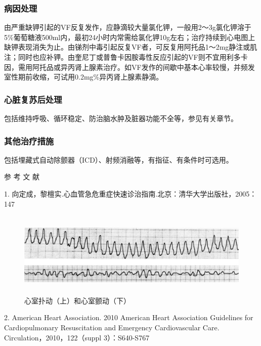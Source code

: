 \subsubsection{病因处理}

由严重缺钾引起的VF反复发作，应静滴较大量氯化钾，一般用2～3g氯化钾溶于5\%葡萄糖液500ml内，最初24小时内常需给氯化钾10g左右；治疗持续到心电图上缺钾表现消失为止。由锑剂中毒引起反复VF者，可反复用阿托品1～2mg静注或肌注；同时也应补钾。由奎尼丁或普鲁卡因胺毒性反应引起的VF则不宜用利多卡因，需用阿托品或异丙肾上腺素治疗。如VF发作的间歇中基本心率较慢，并频发室性期前收缩，可试用0.2mg\%异丙肾上腺素静滴。

\subsubsection{心脏复苏后处理}

包括维持呼吸、循环稳定、防治脑水肿及脏器功能不全等，参见有关章节。

\subsubsection{其他治疗措施}

包括埋藏式自动除颤器（ICD）、射频消融等，有指征、有条件时可选用。

\hypertarget{text00296.htmlux5cux23CHP10-2-9-4}{}
参 考 文 献

1.
向定成，黎檀实.心血管急危重症快速诊治指南.北京：清华大学出版社，2005：147

\begin{figure}[!htbp]
 \centering
 \includegraphics[width=6.29167in,height=1.59375in]{./images/Image00458.jpg}
 \captionsetup{justification=centering}
 \caption{心室扑动（上）和心室颤动（下）}
 \label{fig102-19}
  \end{figure} 

2. American Heart Association. 2010 American Heart Association
Guidelines for Cardiopulmonary Resuscitation and Emergency
Cardiovascular Care. Circulation，2010，122（suppl 3）：S640-S767

\protect\hypertarget{text00297.html}{}{}

